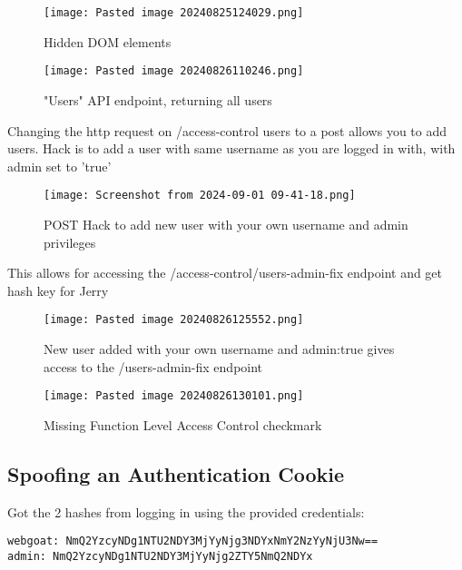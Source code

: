 \documentclass[
	letterpaper, %
	10pt, %
	unnumberedsections, %
	twoside, %
]{APAAssignment}
\begin{document}
\begin{appendices}
\begin{figure} %
	\centering
	\texttt{[image: Pasted image 20240825124029.png]}
	\caption{Hidden DOM elements}
	\label{fig:HiddenDomElements}
\end{figure}

\begin{figure} %
	\centering
	\texttt{[image: Pasted image 20240826110246.png]}
	\caption{"Users" API endpoint, returning all users}
	\label{fig:UsersEndpoint}
\end{figure}

Changing the http request on /access-control users to a post allows you to add users. Hack is to add a user with same username as you are logged in with, with admin set to 'true'




\begin{figure} %
	\centering
	\texttt{[image: Screenshot from 2024-09-01 09-41-18.png]}
	\caption{POST Hack to add new user with your own username and admin privileges}
	\label{fig:AddSelfUserUserHack}
\end{figure}

This allows for accessing the /access-control/users-admin-fix endpoint and get hash key for Jerry


\begin{figure} %
	\texttt{[image: Pasted image 20240826125552.png]}
	\caption{New user added with your own username and admin:true gives access to the /users-admin-fix endpoint}
	\label{fig:AddedNewUser}
\end{figure}

\begin{figure} %
	\centering
	\texttt{[image: Pasted image 20240826130101.png]}
	\caption{Missing Function Level Access Control checkmark}
	\label{fig:MissingFuctionAccessControlCheck}
\end{figure}

\clearpage
\subsection{Spoofing an Authentication Cookie}
Got the 2 hashes from logging in using the provided credentials:

\begin{verbatim}
webgoat: NmQ2YzcyNDg1NTU2NDY3MjYyNjg3NDYxNmY2NzYyNjU3Nw==
admin: NmQ2YzcyNDg1NTU2NDY3MjYyNjg2ZTY5NmQ2NDYx
\end{verbatim}



\end{appendices}
\end{document}

